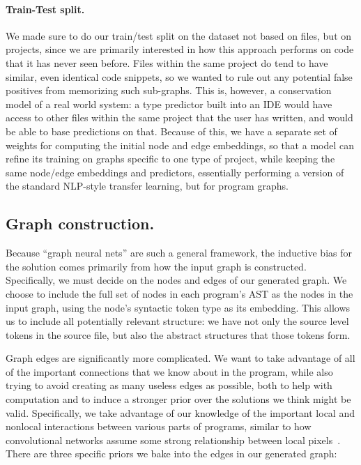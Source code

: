 \paragraph{Train-Test split.}

We made sure to do our train/test split on the dataset not based on files, but on projects, since we are primarily interested in how this approach performs on code that it has never seen before.
Files within the same project do tend to have similar, even identical code snippets, so we wanted to rule out any potential false positives from memorizing such sub-graphs.
This is, however, a conservation model of a real world system: a type predictor built into an IDE would have access to other files within the same project that the user has written, and would be able to base predictions on that.
Because of this, we have a separate set of weights for computing the initial node and edge embeddings, so that a model can refine its training on graphs specific to one type of project, while keeping the same node/edge embeddings and predictors, essentially performing a version of the standard NLP-style transfer learning, but for program graphs.

\subsection{Graph construction.}

Because ``graph neural nets'' are such a general framework, the inductive bias for the solution comes primarily from how the input graph is constructed.
Specifically, we must decide on the nodes and edges of our generated graph.
We choose to include the full set of nodes in each program's AST as the nodes in the input graph, using the node's syntactic token type as its embedding.
This allows us to include all potentially relevant structure: we have not only the source level tokens in the source file, but also the abstract structures that those tokens form.

Graph edges are significantly more complicated.
We want to take advantage of all of the important connections that we know about in the program, while also trying to avoid creating as many useless edges as possible, both to help with computation and to induce a stronger prior over the solutions we think might be valid.
Specifically, we take advantage of our knowledge of the important local and nonlocal interactions between various parts of programs, similar to how convolutional networks assume some strong relationship between local pixels~\cite{henaff2015deep}.
There are three specific priors we bake into the edges in our generated graph:

